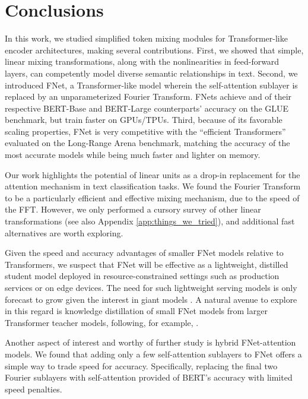 \documentclass[11pt]{article}
\begin{document}
 \section{Conclusions}
\label{sec:conclusion}

In this work, we studied simplified token mixing modules for Transformer-like encoder architectures, making several contributions. First, we showed that simple, linear mixing transformations, along with the nonlinearities in feed-forward layers, can competently model diverse semantic relationships in text. Second, we introduced FNet, a Transformer-like model wherein the self-attention sublayer is replaced by an unparameterized Fourier Transform. FNets achieve  and  of their respective BERT-Base and BERT-Large counterparts' accuracy on the GLUE benchmark, but train  faster on GPUs/TPUs. Third, because of its favorable scaling properties, FNet is very competitive with the ``efficient Transformers'' evaluated on the Long-Range Arena benchmark, matching the accuracy of the most accurate models while being much faster and lighter on memory. 

Our work highlights the potential of linear units as a drop-in replacement for the attention mechanism in text classification tasks. We found the Fourier Transform to be a particularly efficient and effective mixing mechanism, due to the speed of the FFT. However, we only performed a cursory survey of other linear transformations (see also Appendix \ref{app:things_we_tried}), and additional fast alternatives are worth exploring.

Given the speed and accuracy advantages of smaller FNet models relative to Transformers, we suspect that FNet will be effective as a lightweight, distilled student model deployed in resource-constrained settings such as production services or on edge devices. The need for such lightweight serving models is only forecast to grow given the interest in giant models \citep{raffel2019exploring, brown2020language, lepikhin2020gshard}. A natural avenue to explore in this regard is knowledge distillation of small FNet models from larger Transformer teacher models, following, for example, \citet{sanh2019distilbert, jiao2019tinybert, turc2019well}.

Another aspect of interest and worthy of further study is hybrid FNet-attention models. We found that adding only a few self-attention sublayers to FNet offers a simple way to trade speed for accuracy. Specifically, replacing the final two Fourier sublayers with self-attention provided  of BERT's accuracy with limited speed penalties.
\end{document}
